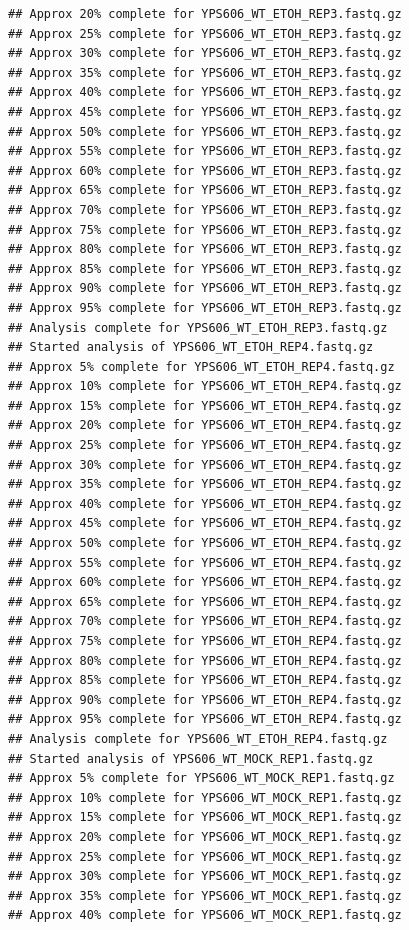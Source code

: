 \documentclass[
]{book}
\begin{document}
\begin{verbatim}
## Approx 20% complete for YPS606_WT_ETOH_REP3.fastq.gz
## Approx 25% complete for YPS606_WT_ETOH_REP3.fastq.gz
## Approx 30% complete for YPS606_WT_ETOH_REP3.fastq.gz
## Approx 35% complete for YPS606_WT_ETOH_REP3.fastq.gz
## Approx 40% complete for YPS606_WT_ETOH_REP3.fastq.gz
## Approx 45% complete for YPS606_WT_ETOH_REP3.fastq.gz
## Approx 50% complete for YPS606_WT_ETOH_REP3.fastq.gz
## Approx 55% complete for YPS606_WT_ETOH_REP3.fastq.gz
## Approx 60% complete for YPS606_WT_ETOH_REP3.fastq.gz
## Approx 65% complete for YPS606_WT_ETOH_REP3.fastq.gz
## Approx 70% complete for YPS606_WT_ETOH_REP3.fastq.gz
## Approx 75% complete for YPS606_WT_ETOH_REP3.fastq.gz
## Approx 80% complete for YPS606_WT_ETOH_REP3.fastq.gz
## Approx 85% complete for YPS606_WT_ETOH_REP3.fastq.gz
## Approx 90% complete for YPS606_WT_ETOH_REP3.fastq.gz
## Approx 95% complete for YPS606_WT_ETOH_REP3.fastq.gz
## Analysis complete for YPS606_WT_ETOH_REP3.fastq.gz
## Started analysis of YPS606_WT_ETOH_REP4.fastq.gz
## Approx 5% complete for YPS606_WT_ETOH_REP4.fastq.gz
## Approx 10% complete for YPS606_WT_ETOH_REP4.fastq.gz
## Approx 15% complete for YPS606_WT_ETOH_REP4.fastq.gz
## Approx 20% complete for YPS606_WT_ETOH_REP4.fastq.gz
## Approx 25% complete for YPS606_WT_ETOH_REP4.fastq.gz
## Approx 30% complete for YPS606_WT_ETOH_REP4.fastq.gz
## Approx 35% complete for YPS606_WT_ETOH_REP4.fastq.gz
## Approx 40% complete for YPS606_WT_ETOH_REP4.fastq.gz
## Approx 45% complete for YPS606_WT_ETOH_REP4.fastq.gz
## Approx 50% complete for YPS606_WT_ETOH_REP4.fastq.gz
## Approx 55% complete for YPS606_WT_ETOH_REP4.fastq.gz
## Approx 60% complete for YPS606_WT_ETOH_REP4.fastq.gz
## Approx 65% complete for YPS606_WT_ETOH_REP4.fastq.gz
## Approx 70% complete for YPS606_WT_ETOH_REP4.fastq.gz
## Approx 75% complete for YPS606_WT_ETOH_REP4.fastq.gz
## Approx 80% complete for YPS606_WT_ETOH_REP4.fastq.gz
## Approx 85% complete for YPS606_WT_ETOH_REP4.fastq.gz
## Approx 90% complete for YPS606_WT_ETOH_REP4.fastq.gz
## Approx 95% complete for YPS606_WT_ETOH_REP4.fastq.gz
## Analysis complete for YPS606_WT_ETOH_REP4.fastq.gz
## Started analysis of YPS606_WT_MOCK_REP1.fastq.gz
## Approx 5% complete for YPS606_WT_MOCK_REP1.fastq.gz
## Approx 10% complete for YPS606_WT_MOCK_REP1.fastq.gz
## Approx 15% complete for YPS606_WT_MOCK_REP1.fastq.gz
## Approx 20% complete for YPS606_WT_MOCK_REP1.fastq.gz
## Approx 25% complete for YPS606_WT_MOCK_REP1.fastq.gz
## Approx 30% complete for YPS606_WT_MOCK_REP1.fastq.gz
## Approx 35% complete for YPS606_WT_MOCK_REP1.fastq.gz
## Approx 40% complete for YPS606_WT_MOCK_REP1.fastq.gz

\end{verbatim}
\end{document}
